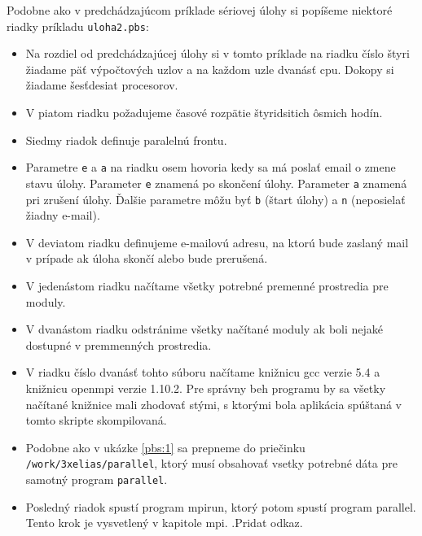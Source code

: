 Podobne ako v predchádzajúcom príklade sériovej úlohy si popíšeme niektoré riadky príkladu \texttt{uloha2.pbs}:
\begin{itemize}
\item
  Na rozdiel od predchádzajúcej úlohy si v tomto príklade na riadku číslo štyri žiadame päť výpočtových uzlov a na každom uzle dvanásť \acrshort{cpu}.
  Dokopy si žiadame šesťdesiat procesorov.
\item
  V piatom riadku požadujeme časové rozpätie štyridsitich ôsmich hodín.
\item
  Siedmy riadok definuje paralelnú frontu.
\item
  Parametre \texttt{e} a \texttt{a} na riadku osem hovoria kedy sa má poslať email o zmene stavu úlohy.
  Parameter \texttt{e} znamená po skončení úlohy.
  Parameter \texttt{a} znamená pri zrušení úlohy.
  Ďalšie parametre môžu byť \texttt{b} (štart úlohy) a \texttt{n} (neposielať žiadny e-mail).
\item
  V deviatom riadku definujeme e-mailovú adresu, na ktorú bude zaslaný mail v prípade ak úloha skončí alebo bude prerušená.
\item
  V jedenástom riadku načítame všetky potrebné premenné prostredia pre moduly.
\item
  V dvanástom riadku odstránime všetky načítané moduly ak boli nejaké dostupné v premmenných prostredia.
\item
  V riadku číslo dvanásť tohto súboru načítame knižnicu gcc verzie 5.4 a knižnicu openmpi verzie 1.10.2.
  Pre správny beh programu by sa všetky načítané knižnice mali zhodovať stými, s ktorými bola aplikácia spúštaná v tomto skripte skompilovaná.
\item
  Podobne ako v ukázke \ref{pbs:1} sa prepneme do priečinku \texttt{/work/3xelias/parallel}, ktorý musí obsahovať vsetky potrebné dáta
  pre samotný program \texttt{parallel}.
\item
  Posledný riadok spustí program mpirun, ktorý potom spustí program parallel. Tento krok je vysvetlený v kapitole mpi. .Pridat odkaz.
\end{itemize}



%
%
%
%
%
%
%
%


